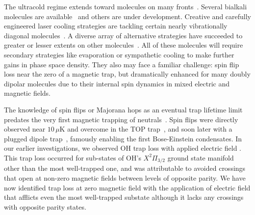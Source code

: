 \documentclass[%
 reprint,
groupedaddress,
 amsmath,amssymb,
 aps,
prl,
]{revtex4-1}
\begin{document}
%
%
The ultracold regime extends toward molecules on many fronts~\cite{Carr2009}. Several bialkali molecules are available~\cite{Ni2008, Takekoshi2014, Park2015} and others are under development. Creative and carefully engineered laser cooling strategies are tackling certain nearly vibrationally diagonal molecules~\cite{Steinecker2016, Barry2014, Hemmerling2016, Hummon2013, Zhelyazkova2014}. A diverse array of alternative strategies have succeeded to greater or lesser extents on other molecules~\cite{Doyle1998,Prehn2016,Bethlem1999,Bochinski2003,Akerman2015}. All of these molecules will require secondary strategies like evaporation or sympathetic cooling to make further gains in phase space density. They also may face a familiar challenge: spin flip loss near the zero of a magnetic trap, but dramatically enhanced for many doubly dipolar molecules due to their internal spin dynamics in mixed electric and magnetic fields. 

The knowledge of spin flips or Majorana hops as an eventual trap lifetime limit predates the very first magnetic trapping of neutrals~\cite{Migdall1985}. Spin flips were directly observed near $10\,\mu\text{K}$ and overcome in the TOP trap~\cite{Petrich1995}, and soon later with a plugged dipole trap~\cite{Davis1995}, famously enabling the first Bose-Einstein condensates. In our earlier investigations, we observed OH trap loss with applied electric field \cite{stuhl2012uwave}. This trap loss occurred for sub-states of OH's $X^2\Pi_{3/2}$ ground state manifold other than the most well-trapped one, and was attributable to avoided crossings that open at non-zero magnetic fields between levels of opposite parity. We have now identified trap loss at zero magnetic field with the application of electric field that afflicts even the most well-trapped substate although it lacks any crossings with opposite parity states.
\end{document}
